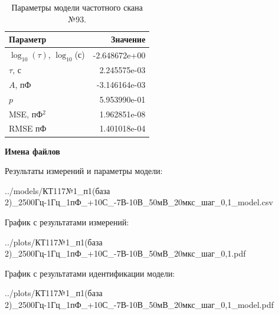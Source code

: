 \begin{table}[!ht]
    \centering
    \caption{Параметры модели частотного скана №93.}
    \begin{tabular}{|l|r|}
        \hline
        Параметр                                       & Значение                  \\ \hline
        $\log_{10}(\tau)$, $\log_{10}$(с)              & -2.648672e+00             \\ \hline
        $\tau$, с                                      & 2.245575e-03              \\ \hline
        $A$, пФ                                        & -3.146164e-03             \\ \hline
        $p$                                            & 5.953990e-01              \\ \hline
        MSE, пФ$^2$                                    & 1.962851e-08              \\ \hline
        RMSE пФ                                        & 1.401018e-04              \\ \hline
    \end{tabular}
    \label{table:frequency_scan_model_93}
\end{table}

\textbf{Имена файлов}

Результаты измерений и параметры модели:

\scriptsize../models/КТ117№1\_п1(база 2)\_2500Гц-1Гц\_1пФ\_+10С\_-7В-10В\_50мВ\_20мкс\_шаг\_0,1\_model.csv
\normalsize

График с результатами измерений:

\scriptsize../plots/КТ117№1\_п1(база 2)\_2500Гц-1Гц\_1пФ\_+10С\_-7В-10В\_50мВ\_20мкс\_шаг\_0,1.pdf
\normalsize

График с результатами идентификации модели:

\scriptsize../plots/КТ117№1\_п1(база 2)\_2500Гц-1Гц\_1пФ\_+10С\_-7В-10В\_50мВ\_20мкс\_шаг\_0,1\_model.pdf
\normalsize

